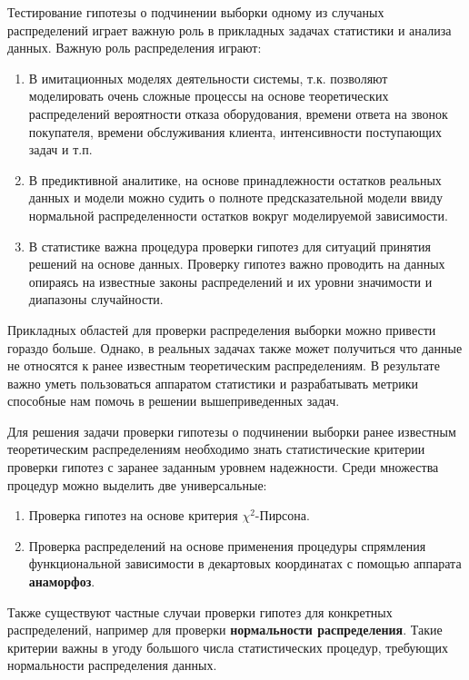 \documentclass[
  14,
]{article}
\begin{document}
Тестирование гипотезы о подчинении выборки одному из случаных
распределений играет важную роль в прикладных задачах статистики и
анализа данных. Важную роль распределения играют:

\begin{enumerate}
\def\labelenumi{\arabic{enumi}.}
\item
  В имитационных моделях деятельности системы, т.к. позволяют
  моделировать очень сложные процессы на основе теоретических
  распределений вероятности отказа оборудования, времени ответа на
  звонок покупателя, времени обслуживания клиента, интенсивности
  поступающих задач и т.п.
\item
  В предиктивной аналитике, на основе принадлежности остатков реальных
  данных и модели можно судить о полноте предсказательной модели ввиду
  нормальной распределенности остатков вокруг моделируемой зависимости.
\item
  В статистике важна процедура проверки гипотез для ситуаций принятия
  решений на основе данных. Проверку гипотез важно проводить на данных
  опираясь на известные законы распределений и их уровни значимости и
  диапазоны случайности.
\end{enumerate}

Прикладных областей для проверки распределения выборки можно привести
гораздо больше. Однако, в реальных задачах также может получиться что
данные не относятся к ранее известным теоретическим распределениям. В
результате важно уметь пользоваться аппаратом статистики и разрабатывать
метрики способные нам помочь в решении вышеприведенных задач.

Для решения задачи проверки гипотезы о подчинении выборки ранее
известным теоретическим распределениям необходимо знать статистические
критерии проверки гипотез с заранее заданным уровнем надежности. Среди
множества процедур можно выделить две универсальные:

\begin{enumerate}
\def\labelenumi{\arabic{enumi}.}
\item
  Проверка гипотез на основе критерия \(\chi^2\)-Пирсона.
\item
  Проверка распределений на основе применения процедуры спрямления
  функциональной зависимости в декартовых координатах с помощью аппарата
  \textbf{анаморфоз}.
\end{enumerate}

Также существуют частные случаи проверки гипотез для конкретных
распределений, например для проверки \textbf{нормальности
распределения}. Такие критерии важны в угоду большого числа
статистических процедур, требующих нормальности распределения данных.
\end{document}
